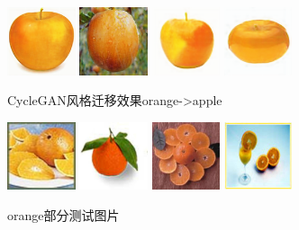 \documentclass[conference]{IEEEtran}
\begin{document}
\begin{figure}[H]
	\centering
	\includegraphics[width=2cm]{PIC/apple2orange/n07740461_1190_fake_B.png}
	\includegraphics[width=2cm]{PIC/apple2orange/n07740461_10571_fake_B.png}
	\includegraphics[width=2cm]{PIC/apple2orange/n07740461_12300_fake_B.png}
	\includegraphics[width=2cm]{PIC/apple2orange/n07740461_12360_fake_B.png}
	\caption{CycleGAN风格迁移效果orange->apple}
\end{figure}

\begin{figure}[H]
	\centering
	\includegraphics[width=2cm]{PIC/apple2orange/n07740461_1190_real_B.png}
	\includegraphics[width=2cm]{PIC/apple2orange/n07740461_10571_real_B.png}
	\includegraphics[width=2cm]{PIC/apple2orange/n07740461_12300_real_B.png}
	\includegraphics[width=2cm]{PIC/apple2orange/n07740461_12360_real_B.png}
	\caption{orange部分测试图片}
\end{figure}
\end{document}
